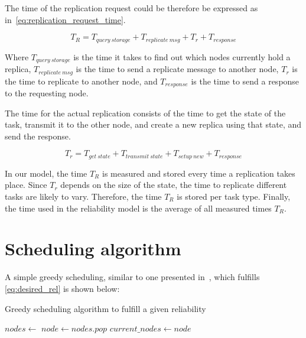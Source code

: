 \documentclass{cslthse-msc}
\begin{document}
The time of the replication request could be therefore be expressed as in~\cref{eq:replication_request_time}.

\begin{equation} \label{eq:replication_request_time}
T_R = T_{query\ storage} + T_{replicate\ msg} + T_{r} + T_{response}
\end{equation} 

Where $T_{query\ storage}$ is the time it takes to find out which nodes currently hold a replica, $T_{replicate\ msg}$ is the time to send a replicate message to another node, $T_{r}$ is the time to replicate to another node, and $T_{response}$ is the time to send a response to the requesting node.

The time for the actual replication consists of the time to get the state of the task, transmit it to the other node, and create a new replica using that state, and send the response.

\begin{equation} \label{eq:replication_time}
T_{r} = T_{get\ state} + T_{transmit\ state} + T_{setup\ new} + T_{response}
\end{equation} 

In our model, the time $T_{R}$ is measured and stored every time a replication takes place. Since $T_{r}$ depends on the size of the state, the time to replicate different tasks are likely to vary. Therefore, the time $T_{R}$ is stored per task type. Finally, the time used in the reliability model is the average of all measured times $T_{R}$.


\section{Scheduling algorithm} \label{sec:design_sched_alg}
A simple greedy scheduling, similar to one presented in~\cite{effTaskReplMobGrid}, which fulfills \cref{eq:desired_rel} is shown below:


\begin{algorithm}[H]
	\caption{Greedy scheduling algorithm to fulfill a given reliability} \label{alg:scheduling}
	\begin{algorithmic}[1]
	\Statex
	\State $nodes\gets $ 
		\State $node\gets nodes.pop$
		\State
		\State $current\_nodes\gets node$
	\EndWhile
	\EndProcedure
	\end{algorithmic}
\end{algorithm} 
\end{document}

